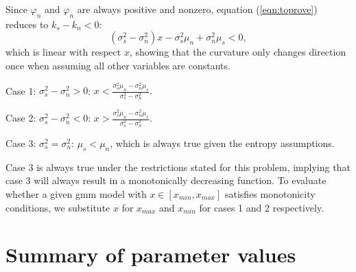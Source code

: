 {\begin{subappendices}
    Since $\varphi_n$ and  $\varphi_n$ are always positive and nonzero, equation (\ref{eqn:toprove}) reduces to $k_s - k_n < 0$:
    \begin{equation}
        (\sigma_s^2 - \sigma_n^2) x - \sigma_s^2\mu_n +\sigma_n^2\mu_s < 0,
    \end{equation}
    which is linear with respect $x$, showing that the curvature only changes direction once when assuming all other variables are constants. 
    
    Case 1: $\sigma_s^2 - \sigma_n^2 > 0$: $ x < \frac{\sigma_s^2\mu_n - \sigma_n^2\mu_s}{\sigma_s^2 - \sigma_n^2}.$
    
    Case 2: $\sigma_s^2 - \sigma_n^2 < 0$: $x > \frac{\sigma_s^2\mu_n - \sigma_n^2\mu_s}{\sigma_s^2 - \sigma_n^2}.$
    
    Case 3: $\sigma_s^2 = \sigma_n^2$: $\mu_s < \mu_n$, which is always true given the entropy assumptions.
    
    Case 3 is always true under the restrictions stated for this problem, implying that case 3 will always result in a monotonically decreasing function. To evaluate whether a given \ac{gmm} model with $x \in [x_{min}, x_{max}]$ satisfies monotonicity conditions, we substitute $x$ for $x_{max}$ and $x_{min}$ for cases 1 and 2 respectively.
    
    \clearpage
    
    \section{Summary of parameter values}
    

\end{subappendices}}
